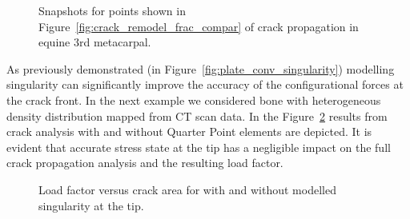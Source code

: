\documentclass[review]{elsarticle}
\numberwithin{equation}{section}
\begin{document}
\begin{figure}[h!]
	\begin{centering}
		
	\end{centering}		
		\caption{Snapshots for points shown in Figure~\ref{fig:crack_remodel_frac_compar} of crack propagation in equine 3rd metacarpal. }
		\label{fig:crack_snapshots}
\end{figure}


As previously demonstrated (in Figure~\ref{fig:plate_conv_singularity}) modelling singularity can significantly improve the accuracy of the configurational forces at the crack front. In the next example we considered bone with heterogeneous density distribution mapped from CT scan data. In the Figure~\ref{fig:crack_singular_vs_non} results from crack analysis with and without Quarter Point elements are depicted. It is evident that accurate stress state at the tip has a negligible impact on the full crack propagation analysis and the resulting load factor. 

\begin{figure}
	\centering
	\caption{Load factor versus crack area for with and without modelled singularity at the tip.}
	\label{fig:crack_singular_vs_non}
\end{figure}
\end{document}
